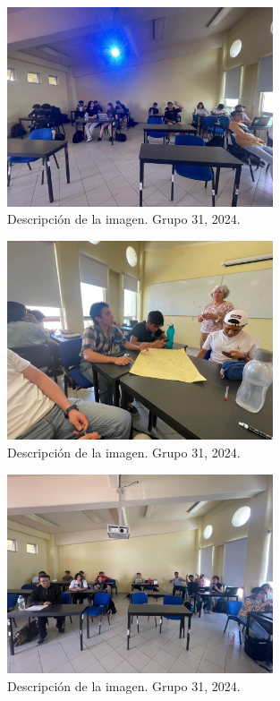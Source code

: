\begin{figure}
    \caption{Descripción de la imagen. Grupo 31, 2024.\label{fig:No.1}}
    \includegraphics[width=0.7\textwidth]{./assets/img/imagen2DH.jpeg}
\end{figure}

\begin{figure}
    \caption{Descripción de la imagen. Grupo 31, 2024.\label{fig:No.2}}
    \includegraphics[width=0.7\textwidth]{./assets/img/imagen1DH.jpeg}
\end{figure}

\begin{figure}
    \caption{Descripción de la imagen. Grupo 31, 2024.\label{fig:No.3}}
    \includegraphics[width=0.7\textwidth]{./assets/img/imagen3DH.jpeg}
\end{figure}


